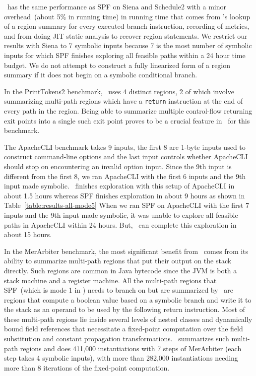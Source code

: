 \tool\ has the same performance as SPF on Siena and Schedule2 with a minor overhead~(about 5\% in running time) in
running time that comes from \tool\rq s lookup of a region summary for every executed branch instruction, recording of
metrics, and from doing JIT static analysis to recover region statements.
%
We restrict our results with Siena to 7 symbolic inputs because 7 is the most number of symbolic inputs for which
SPF finishes exploring all feasible paths within a 24 hour time budget.
%
We do not attempt to construct a fully linearized form of a region summary if it does not begin on a symbolic conditional
branch.

In the PrintTokens2 benchmark, \tool\ uses 4 distinct regions, 2 of which involve summarizing multi-path regions which
have a {\tt return} instruction at the end of every path in the region.
%
Being able to summarize multiple control-flow returning exit points into a single such exit point proves to be a crucial
feature in \tool\ for this benchmark.

The ApacheCLI benchmark takes 9 inputs, the first 8 are 1-byte inputs used to construct command-line options and
the last input controls whether ApacheCLI should stop on encountering an invalid option input.
%
Since the 9th input is different from the first 8, we ran ApacheCLI with the first 6 inputs and the 9th input
made symbolic.
%
\tool\ finishes exploration with this setup of ApacheCLI in about 1.5 hours whereas SPF finishes exploration in about 9
hours as shown in Table~\ref{table:results-all-mode5}
%
When we ran SPF on ApacheCLI with the first 7 inputs and the 9th input made symbolic, it was unable to explore all
feasible paths in ApacheCLI within 24 hours.
%
But, \tool\ can complete this exploration in about 15 hours.

In the MerArbiter benchmark, the most significant benefit from \tool\ comes from its ability to summarize multi-path
regions that put their output on the stack directly.
%
Such regions are common in Java bytecode since the JVM is both a stack machine and a register machine.
%
All the multi-path regions that SPF~(which is mode 1 in \tool) needs to branch on but are summarized by \tool\ are
regions that compute a boolean value based on a symbolic branch and write it to the stack as an operand to be used
by the following return instruction.
%
Most of these multi-path regions lie inside several levels of nested classes and dynamically bound field references
that necessitate a fixed-point computation over the field substitution and constant propagation transformations.
%
\tool\ summarizes such multi-path regions and does 411,000 instantiations with 7 steps of MerArbiter (each step takes 4
symbolic inputs), with more than 282,000 instantiations needing more than 8 iterations of the fixed-point computation.


